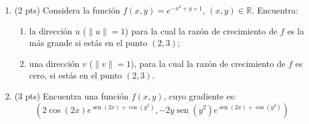 \documentclass[12pt]{article}
\newcommand{\sen}{\operatorname{sen}}
\begin{document}
\bigskip

            
\bigskip
\bigskip
\bigskip


\begin{enumerate}

  
\item (2 pts) Considera la funci\'on
  $f(x,y)=e^{-x^2+y+1}$, $(x,y)\in \mathbb{R}$. Encuentra:
  \begin{enumerate}
    \item la direcci\'on $u$ ($\|u\|=1$) para la cual
      la raz\'on de crecimiento de $f$ es la m\'as grande si est\'as
      en el punto $(2,3)$;
     \item una direcci\'on $v$ ($\|v\|=1$), para la cual
       la raz\'on de crecimiento de $f$ es cero, si est\'as en el punto
       $(2,3)$.
\end{enumerate}


  
\vspace{4cm}  


\item (3 pts) Encuentra una funci\'on $f(x,y)$, cuyo gradiente es:
  $$(2\cos(2x)e^{\sen(2x)+\cos(y^2)},-2y\sen(y^2)e^{\sen(2x)+\cos(y^2)})$$

\end{enumerate}


  
\end{document}
